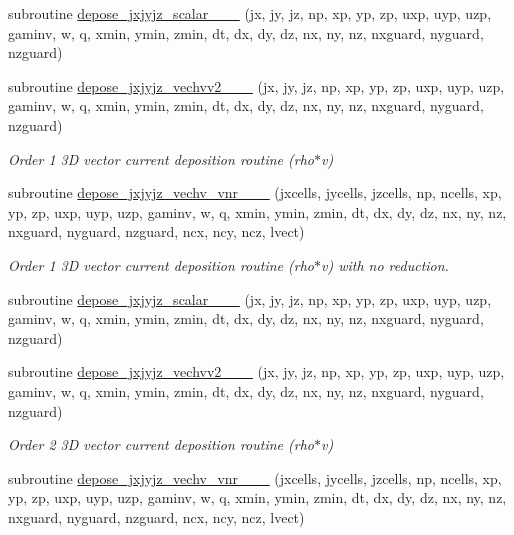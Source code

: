 \begin{DoxyCompactItemize}
subroutine \hyperlink{current__deposition_8_f90_a7347c7791083dae1b946cdbdce60602f}{depose\+\_\+jxjyjz\+\_\+scalar\+\_\+\_\+\_} (jx, jy, jz, np, xp, yp, zp, uxp, uyp, uzp, gaminv, w, q, xmin, ymin, zmin,                                       dt, dx, dy, dz, nx, ny, nz, nxguard, nyguard, nzguard)
\item 
subroutine \hyperlink{current__deposition_8_f90_a084ed42e79187e34df1e5e49cb589e87}{depose\+\_\+jxjyjz\+\_\+vechvv2\+\_\+\_\+\_} (jx, jy, jz, np, xp, yp, zp, uxp, uyp, uzp, gaminv, w, q, xmin, ymin, zmin,                                       dt, dx, dy, dz, nx, ny, nz, nxguard, nyguard, nzguard)
\begin{DoxyCompactList}\small\item\em Order 1 3D vector current deposition routine (rho$\ast$v) \end{DoxyCompactList}\item 
subroutine \hyperlink{current__deposition_8_f90_a640df01330ec2f2b5ffcb43938a71db5}{depose\+\_\+jxjyjz\+\_\+vechv\+\_\+vnr\+\_\+\_\+\_} (jxcells, jycells, jzcells, np, ncells, xp, yp, zp,                                   uxp, uyp, uzp, gaminv, w, q, xmin, ymin, zmin,                                       dt, dx, dy, dz, nx, ny, nz, nxguard, nyguard, nzguard, ncx, ncy, ncz, lvect)
\begin{DoxyCompactList}\small\item\em Order 1 3D vector current deposition routine (rho$\ast$v) with no reduction. \end{DoxyCompactList}\item 
subroutine \hyperlink{current__deposition_8_f90_a3b2c43f71118a3d22ad1d1fea9494fa4}{depose\+\_\+jxjyjz\+\_\+scalar\+\_\+\_\+\_} (jx, jy, jz, np, xp, yp, zp, uxp, uyp, uzp, gaminv, w, q, xmin, ymin, zmin,                                       dt, dx, dy, dz, nx, ny, nz, nxguard, nyguard, nzguard)
\item 
subroutine \hyperlink{current__deposition_8_f90_a82878814b59bae3273786c1c0e92deb6}{depose\+\_\+jxjyjz\+\_\+vechvv2\+\_\+\_\+\_} (jx, jy, jz, np, xp, yp, zp, uxp, uyp, uzp, gaminv, w, q, xmin, ymin, zmin,                                       dt, dx, dy, dz, nx, ny, nz, nxguard, nyguard, nzguard)
\begin{DoxyCompactList}\small\item\em Order 2 3D vector current deposition routine (rho$\ast$v) \end{DoxyCompactList}\item 
subroutine \hyperlink{current__deposition_8_f90_a110bf577b181354401374e000770acbf}{depose\+\_\+jxjyjz\+\_\+vechv\+\_\+vnr\+\_\+\_\+\_} (jxcells, jycells, jzcells, np, ncells, xp, yp, zp,                                   uxp, uyp, uzp, gaminv, w, q, xmin, ymin, zmin,                                       dt, dx, dy, dz, nx, ny, nz, nxguard, nyguard, nzguard, ncx, ncy, ncz, lvect)

\end{DoxyCompactItemize}
